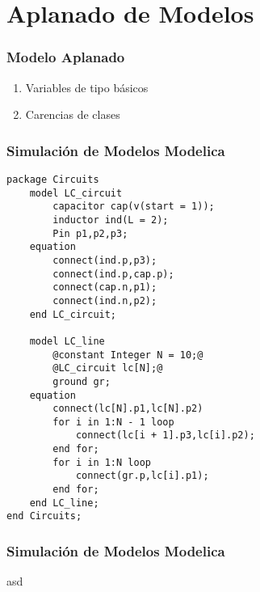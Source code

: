 \section{Aplanado de Modelos}

\begin{frame}[fragile]
\frametitle{Modelo Aplanado} 
\begin{enumerate}
\item Variables de tipo b\'asicos
\item Carencias de clases

\end{enumerate}
\end{frame}


\begin{frame}[fragile]
\frametitle{Simulaci\'on de Modelos Modelica} 
\begin{lstlisting}[style=base,basicstyle=\tiny]
package Circuits
    model LC_circuit
        capacitor cap(v(start = 1));
        inductor ind(L = 2);
        Pin p1,p2,p3;
    equation
        connect(ind.p,p3);
        connect(ind.p,cap.p);
        connect(cap.n,p1);
        connect(ind.n,p2);
    end LC_circuit;
    
    model LC_line
        @constant Integer N = 10;@
        @LC_circuit lc[N];@
        ground gr;
    equation
        connect(lc[N].p1,lc[N].p2)      
        for i in 1:N - 1 loop
            connect(lc[i + 1].p3,lc[i].p2);
        end for;
        for i in 1:N loop
            connect(gr.p,lc[i].p1);
        end for;
    end LC_line;
end Circuits;   
\end{lstlisting}
\end{frame}

\begin{frame}[fragile]
\frametitle{Simulaci\'on de Modelos Modelica} 
asd
\end{frame}
